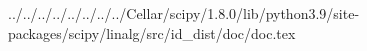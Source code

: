 ../../../../../../../../Cellar/scipy/1.8.0/lib/python3.9/site-packages/scipy/linalg/src/id_dist/doc/doc.tex